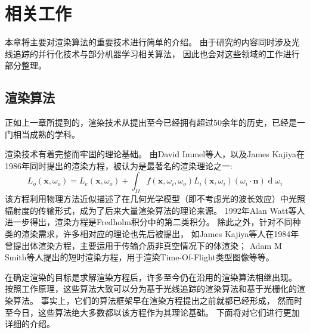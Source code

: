 \chapter{相关工作}
\label{cha:relatedwork}
本章将主要对渲染算法的重要技术进行简单的介绍。
由于研究的内容同时涉及光线追踪的并行化技术与部分机器学习相关算法，
因此也会对这些领域的工作进行部分整理。

\section{渲染算法}

正如上一章所提到的，渲染技术从提出至今已经拥有超过50余年的历史，已经是一门相当成熟的学科。


渲染技术有着完整而牢固的理论基础。
由David Immel等人\cite{RenderingEquation1}，以及James Kajiya\cite{RenderingEquation2}在1986年同时提出的渲染方程，被认为是最著名的渲染理论之一:
\begin{equation}
    L_o(\mathbf{x}, \omega_o)=L_e(\mathbf{x},\omega_o)+\int_{\Omega} f(\mathbf{x}, \omega_i, \omega_o) L_i(\mathbf{x}, \omega_i) (\omega_i \cdot \mathbf{n}) \operatorname d\omega_i
\end{equation}
该方程利用物理方法近似描述了在几何光学模型（即不考虑光的波长效应）中光照辐射度的传输形式，成为了后来大量渲染算法的理论来源。
1992年Alan Watt等人进一步得出，渲染方程是Fredholm积分中的第二类积分\cite{Fredholm}。
除此之外，针对不同种类的渲染需求，许多相对应的理论也先后被提出，
如James Kajiya等人在1984年曾提出体渲染方程\cite{VolumnRenderingEquation}，主要运用于传输介质非真空情况下的体渲染；
Adam M Smith等人提出的短时渲染方程\cite{TransientEquation}，用于渲染Time-Of-Flight类型图像等等。



在确定渲染的目标是求解渲染方程后，许多至今仍在沿用的渲染算法相继出现。
按照工作原理，这些算法大致可以分为基于光线追踪的渲染算法和基于光栅化的渲染算法。   
事实上，它们的算法框架早在渲染方程提出之前就都已经形成，
然而时至今日，这些算法绝大多数都以该方程作为其理论基础。
下面将对它们进行更加详细的介绍。

